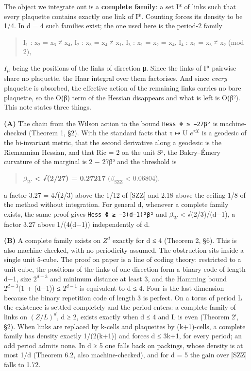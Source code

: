 \documentclass[11pt,a4paper]{article}
\theoremstyle{named}
\begin{document}
The object we integrate out is a \textbf{complete family}: a set I* of links such that every plaquette contains exactly one link of I*. Counting forces its density to be 1/4. In d = 4 such families exist; the one used here is the period-2 family

\begin{quote}
I₁ : x₂ = x₃ ≠ x₄,  I₂ : x₃ = x₄ ≠ x₁,  I₃ : x₁ = x₂ = x₄,  I₄ : x₁ = x₃ ≠ x₂  (mod 2),
\end{quote}
$I_{μ}$ being the positions of the links of direction μ. Since the links of I* pairwise share no plaquette, the Haar integral over them factorises. And since \textit{every} plaquette is absorbed, the effective action of the remaining links carries no bare plaquette, so the O(β) term of the Hessian disappears and what is left is O(β²). This note states three things.

\textbf{(A)} The chain from the Wilson action to the bound \texttt{Hess\ \allowbreak{}Φ\ \allowbreak{}≥\ \allowbreak{}−27β²} is machine-checked (Theorem 1, §2). With the standard facts that τ ↦ U $e^{τX}$ is a geodesic of the bi-invariant metric, that the second derivative along a geodesic is the Riemannian Hessian, and that Ric = 2 on the unit S³, the Bakry–Émery curvature of the marginal is 2 − 27β² and the threshold is

\begin{quote}
\textbf{$β_W$ \textless{} √(2/27) = 0.27217}  $(β_{\mathrm{SZZ}}$ \textless{} 0.06804),
\end{quote}
a factor 3.27 = 4√(2/3) above the 1/12 of [SZZ] and 2.18 above the ceiling 1/8 of the method without integration. For general d, whenever a complete family exists, the same proof gives \texttt{Hess\ \allowbreak{}Φ\ \allowbreak{}≥\ \allowbreak{}−3(d−1)²β²} and $β_W$ \textless{} √(2/3)/(d−1), a factor 3.27 above 1/(4(d−1)) independently of d.

\textbf{(B)} A complete family exists on $Z^d$ exactly for d ≤ 4 (Theorem 2, §6). This is also machine-checked, with no periodicity assumed. The obstruction sits inside a single unit 5-cube. The proof on paper is a line of coding theory: restricted to a unit cube, the positions of the links of one direction form a binary code of length d−1, size $2^{d−3}$ and minimum distance at least 3, and the Hamming bound $2^{d−3}(1$ + (d−1)) ≤ $2^{d−1}$ is equivalent to d ≤ 4. Four is the last dimension because the binary repetition code of length 3 is perfect. On a torus of period L the existence is settled completely and the period enters: a complete family of links on $(Z/L)^d$, d ≥ 2, exists exactly when d ≤ 4 and L is even (Theorem 2′, §2). When links are replaced by k-cells and plaquettes by (k+1)-cells, a complete family has density exactly 1/(2(k+1)) and forces d ≤ 3k+1, for every period; an odd period admits none. In d ≥ 5 one falls back on packings, whose density is at most 1/d (Theorem 6.2, also machine-checked), and for d = 5 the gain over [SZZ] falls to 1.72.
\end{document}

